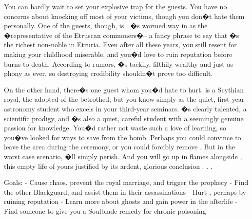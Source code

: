 \documentclass[char]{Kos}
\begin{document}
You can hardly wait to set your explosive trap for the guests. You have no concerns about knocking off most of your victims, though you don�t hate them personally. One of the guests, though, is \cMerchant{\nickname}. \cMerchant{\They}�s wormed \cMerchant{\their} way in as the �representative of the Etruscan commoners�-- a fancy phrase to say that \cMerchant{\they}�s the richest non-noble in Etruria. Even after all these years, you still resent \cMerchant{\them} for making your childhood miserable, and you�d love to ruin \cMerchant{\their} reputation before \cMerchant{\they} burns to death. According to rumors, \cMerchant{\they}�s tackily, filthily wealthy and just as phony as ever, so destroying \cMerchant{\their} credibility shouldn�t prove too difficult.

On the other hand, there�s one guest whom you�d hate to hurt. \cWard{\nickname} is a Scythian royal, the adopted \cWard{\sibling} of the betrothed, but you know \cWard{\them} simply as the quiet, first-year astronomy student who excels in your third-year seminars. \cWard{\They}�s clearly talented, a scientific prodigy, and \cWard{\they}�s also a quiet, careful student with a seemingly genuine passion for knowledge. You�d rather not waste such a love of learning, so you�ve looked for ways to save \cWard{\them} from the bomb. Perhaps you could convince \cWard{\them} to leave the area during the ceremony, or you could forcibly remove \cWard{\them}. But in the worst case scenario, \cWard{\they}�ll simply perish. And you will go up in flames alongside \cWard{\them}, this empty life of yours justified by its ardent, glorious conclusion . . .

Goals:
- Cause chaos, prevent the royal marriage, and trigger the prophecy
- Find the other Blackguard, and assist them in their assassinations
- Hurt \cMerchant{\nickname}, perhaps by ruining \cMerchant{\their} reputation
- Learn more about ghosts and gain power in the afterlife
- Find someone to give you a Soulblade remedy for chronic poisoning
\end{document}
